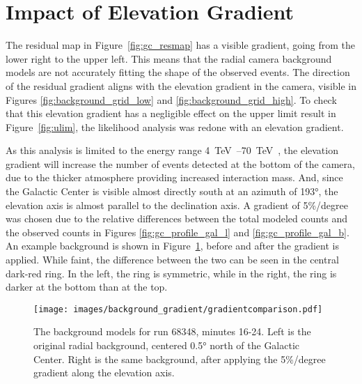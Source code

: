 \FloatBarrier

\section{Impact of Elevation Gradient}\label{sec:elevgradient}

The residual map in Figure~\ref{fig:gc_resmap} has a visible gradient, going from the lower right to the upper left.
This means that the radial camera background models are not accurately fitting the shape of the observed events.
The direction of the residual gradient aligns with the elevation gradient in the camera, visible in Figures \ref{fig:background_grid_low} and \ref{fig:background_grid_high}.
To check that this elevation gradient has a negligible effect on the upper limit result in Figure~\ref{fig:ulim}, the likelihood analysis was redone with an elevation gradient.

As this analysis is limited to the energy range \SIrange{4}{70}{\TeV{}}, the elevation gradient will increase the number of events detected at the bottom of the camera, due to the thicker atmosphere providing increased interaction mass.
And, since the Galactic Center is visible almost directly south at an azimuth of \ang{193}, the elevation axis is almost parallel to the declination axis.
A gradient of 5\%/degree was chosen due to the relative differences between the total modeled counts and the observed counts in Figures \ref{fig:gc_profile_gal_l} and \ref{fig:gc_profile_gal_b}.
An example background is shown in Figure~\ref{fig:bkg_flatvsgrad}, before and after the gradient is applied.
While faint, the difference between the two can be seen in the central dark-red ring.
In the left, the ring is symmetric, while in the right, the ring is darker at the bottom than at the top.

\begin{figure}[tb]
  \centering
  \texttt{[image: images/background\_gradient/gradientcomparison.pdf]}
  \caption[Background Gradient Comparison]{
    The background models for run 68348, minutes 16-24.
    Left is the original radial background, centered \ang{0.5} north of the Galactic Center.
    Right is the same background, after applying the 5\%/degree gradient along the elevation axis.
  }
  \label{fig:bkg_flatvsgrad}
\end{figure}

